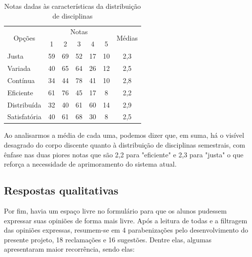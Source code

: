         \begin{table}[htbp]
            \centering
            \caption{\label{table:6.0-Opiniao}Notas dadas às características da distribuição de disciplinas}
            \begin{tabular}{| l | c c c c c | c |}
                \hline
                    \multicolumn{1}{|c|}{\multirow{2}{*}{Opções}} &
                    \multicolumn{5}{c|}{Notas}                    &
                    \multicolumn{1}{|c|}{\multirow{2}{*}{Médias}}
                    \\
                    \multicolumn{1}{|c|}{} &
                    \multicolumn{1}{c|}{1} &
                    \multicolumn{1}{c|}{2} &
                    \multicolumn{1}{c|}{3} &
                    \multicolumn{1}{c|}{4} &
                    \multicolumn{1}{c|}{5} &
                    \multicolumn{1}{|c|}{} \\
                \hline
                    Justa        & 59 & 69 & 52 & 17 & 10  & 2,3 \\
                    Variada      & 40 & 65 & 64 & 26 & 12  & 2,5 \\
                    Contínua     & 34 & 44 & 78 & 41 & 10  & 2,8 \\
                    Eficiente    & 61 & 76 & 45 & 17 &  8  & 2,2 \\
                    Distribuída  & 32 & 40 & 61 & 60 & 14  & 2,9 \\
                    Satisfatória & 40 & 61 & 68 & 30 &  8  & 2,5 \\
                \hline
            \end{tabular}
        \end{table}

        Ao analisarmos a média de cada uma, podemos dizer que, em suma, há o visível desagrado do corpo discente quanto à distribuição de disciplinas semestrais, com ênfase nas duas piores notas que são 2,2 para "eficiente" e 2,3 para "justa" o que reforça a necessidade de aprimoramento do sistema atual.

    \subsection{Respostas qualitativas} %

        Por fim, havia um espaço livre no formulário para que os alunos pudessem expressar suas opiniões de forma mais livre. Após a leitura de todas e a filtragem das opiniões expressas, resumem-se em 4 parabenizações pelo desenvolvimento do presente projeto, 18 reclamações e 16 sugestões. Dentre elas, algumas apresentaram maior recorrência, sendo elas:

